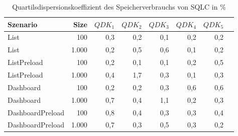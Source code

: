 
\begin{table}[ht]
\setlength{\extrarowheight}{-1pt}
\centering
\caption{Quartilsdispersionskoeffizient des Speicherverbrauchs von SQLC in \%}
\begin{tabular}{lrrrrrrr}
\toprule
Szenario & Size & ${QDK_1}$ & ${QDK_2}$ & ${QDK_3}$& ${QDK_4}$ & ${QDK_5}$ \\
\midrule
	List & 100 & \cellcolor{red!1}  0,3 & \cellcolor{red!1}  0,2 & \cellcolor{red!1}  0,1 & \cellcolor{red!1}  0,2 & \cellcolor{red!1}  0,2 \\
	List & 1.000 & \cellcolor{red!1}  0,2 & \cellcolor{red!1}  0,5 & \cellcolor{red!1}  0,6 & \cellcolor{red!1}  0,1 & \cellcolor{red!1}  0,2 \\
	ListPreload & 100 & \cellcolor{red!1}  0,2 & \cellcolor{red!1}  0,1 & \cellcolor{red!1}  0,1 & \cellcolor{red!1}  0,2 & \cellcolor{red!1}  0,5 \\
	ListPreload & 1.000 & \cellcolor{red!1}  0,4 & \cellcolor{red!2}  1,7 & \cellcolor{red!1}  0,3 & \cellcolor{red!1}  0,1 & \cellcolor{red!1}  0,3 \\
	Dashboard & 100 & \cellcolor{red!1}  0,2 & \cellcolor{red!1}  0,2 & \cellcolor{red!1}  0,3 & \cellcolor{red!1}  0,6 & \cellcolor{red!1}  0,6 \\
	Dashboard & 1.000 & \cellcolor{red!1}  0,7 & \cellcolor{red!1}  0,4 & \cellcolor{red!2}  1,1 & \cellcolor{red!1}  0,2 & \cellcolor{red!1}  0,3 \\
	DashboardPreload & 100 & \cellcolor{red!1}  0,8 & \cellcolor{red!1}  0,4 & \cellcolor{red!1}  0,3 & \cellcolor{red!1}  0,3 & \cellcolor{red!1}  0,4 \\
	DashboardPreload & 1.000 & \cellcolor{red!1}  0,7 & \cellcolor{red!1}  0,3 & \cellcolor{red!1}  0,5 & \cellcolor{red!1}  0,3 & \cellcolor{red!1}  0,2 \\
\bottomrule
\end{tabular}
\label{tab:quartilsdispersionskoeffizient_speicherverbrauch_sqlc}
\end{table}
	